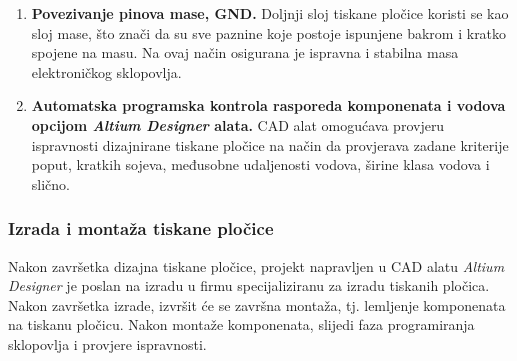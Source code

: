 \documentclass[11pt,a4paper]{article}
\begin{document}
\begin{center}
\begin{enumerate}
		\item \textbf{Povezivanje pinova mase, GND.} Doljnji sloj tiskane pločice koristi se kao sloj mase, što znači da su sve paznine koje postoje ispunjene bakrom i kratko spojene na masu. Na ovaj način osigurana je ispravna i stabilna masa elektroničkog sklopovlja.
		\item \textbf{Automatska programska kontrola rasporeda komponenata i vodova opcijom \textit{Altium Designer} alata.} CAD alat omogućava provjeru ispravnosti dizajnirane tiskane pločice na način da provjerava zadane kriterije poput, kratkih sojeva, međusobne udaljenosti vodova, širine klasa vodova i slično.
	\end{enumerate}
\end{center}


\subsubsection{Izrada i montaža tiskane pločice}
Nakon završetka dizajna tiskane pločice, projekt napravljen u CAD alatu \textit{Altium Designer} je poslan na izradu u firmu specijaliziranu za izradu tiskanih pločica.  Nakon završetka izrade, izvršit će se završna montaža, tj. lemljenje komponenata na tiskanu pločicu. Nakon montaže komponenata, slijedi faza programiranja sklopovlja i provjere ispravnosti.
\end{document}
